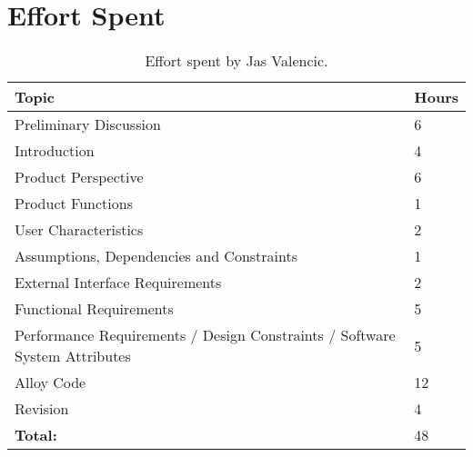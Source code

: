 \chapter{Effort Spent}

\begin{table}[H]
    \centering
    \begin{tabular}{| m{} | m{} |}
        \hline
        \textbf{Topic}                                                             & \textbf{Hours} \\
        \hline
        Preliminary Discussion                                                     & 6              \\
        \hline
        Introduction                                                               & 4              \\
        \hline
        Product Perspective                                                        & 6              \\
        \hline
        Product Functions                                                          & 1              \\
        \hline
        User Characteristics                                                       & 2              \\
        \hline
        Assumptions, Dependencies and Constraints                                  & 1              \\
        \hline
        External Interface Requirements                                            & 2              \\
        \hline
        Functional Requirements                                                    & 5              \\
        \hline
        Performance Requirements / Design Constraints / Software System Attributes & 5              \\
        \hline
        Alloy Code                                                                 & 12             \\
        \hline
        Revision                                                                   & 4              \\
        \hline
        \hline
        \textbf{Total:}                                                            & 48             \\
        \hline
    \end{tabular}
    \caption{Effort spent by Jas Valencic.}
\end{table}

